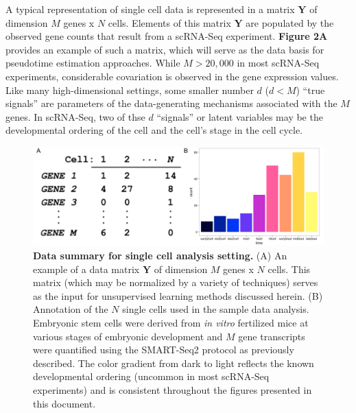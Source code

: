\documentclass[english, 11pt]{article}\usepackage[]{graphicx}\usepackage[]{color}
\begin{document}
A typical representation of single cell data is represented in a matrix $\mathbf{Y}$ of dimension $M$ genes x $N$ cells. Elements of this matrix $\mathbf{Y}$ are populated by the observed gene counts that result from a scRNA-Seq experiment. \textbf{Figure 2A} provides an example of such a matrix, which will serve as the data basis for pseudotime estimation approaches. While $M > 20,000$ in most scRNA-Seq experiments, considerable covariation is observed in the gene expression values. Like many high-dimensional settings, some smaller number $d$ ($d < M$) ``true signals'' are parameters of the data-generating mechanisms associated with the $M$ genes. In scRNA-Seq, two of thse $d$ ``signals'' or latent variables may be the  developmental ordering of the cell and the cell's stage in the cell cycle. \newline
\begin{figure}[H]
\begin{center}
\includegraphics[scale=0.3]{images/Figure2.png}
\end{center}
\caption{\textbf{Data summary for single cell analysis setting.} (A) An example of a data matrix $\mathbf{Y}$ of dimension $M$ genes x $N$ cells. This matrix (which may be normalized by a variety of techniques) serves as the input for unsupervised learning methods discussed herein. (B) Annotation of the $N$ single cells used in the sample data analysis. Embryonic stem cells were derived from \textit{in vitro} fertilized mice at various stages of embryonic development and $M$ gene transcripts were quantified using the SMART-Seq2 protocol as previously described. \cite{deng2014single} The color gradient from dark to light reflects the known developmental ordering (uncommon in most scRNA-Seq experiments) and is consistent throughout the figures presented in this document. }
\end{figure}
\end{document}
